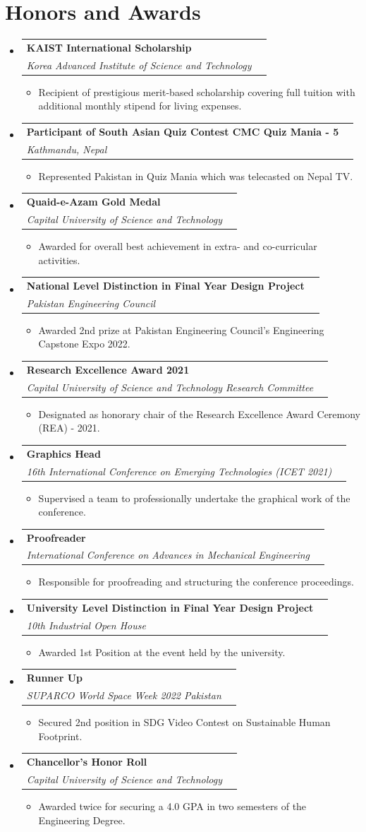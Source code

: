 \documentclass[a4paper,11pt]{article}
\makeatletter
\newcommand{\resumeProject}[4]{
\vspace{0.5mm}\item
    \begin{tabular*}{0.98\textwidth}[t]{l@{\extracolsep{\fill}}r}
        \textbf{#1} & \textit{\footnotesize{#3}} \\
        \footnotesize{\textit{#2}} & \footnotesize{#4}
    \end{tabular*}
    \vspace{-2.4mm}
}
\newcommand{\resumeSubHeadingListStart}{\begin{itemize}[leftmargin=*,labelsep=1mm]}
\newcommand{\resumeItemListStart}{\begin{itemize}[leftmargin=*,labelsep=1mm,itemsep=0.5mm]}
\newcommand{\resumeSubHeadingListEnd}{\end{itemize}\vspace{2mm}}
\newcommand{\resumeItemListEnd}{\end{itemize}\vspace{-2mm}}
\makeatother
\begin{document}
\section{\textbf{Honors and Awards}}
\vspace{-0.4mm}
\resumeSubHeadingListStart
\resumeProject
{KAIST International Scholarship}{Korea Advanced Institute of Science and Technology}
{}{}
\resumeItemListStart
\item Recipient of prestigious merit-based scholarship covering full tuition with additional monthly stipend for living expenses.
\resumeItemListEnd
\resumeProject
{Participant of South Asian Quiz Contest CMC Quiz Mania - 5}{Kathmandu, Nepal}
{}{}
\resumeItemListStart
\item Represented Pakistan in Quiz Mania which was telecasted on Nepal TV.
\resumeItemListEnd
\resumeProject
{Quaid-e-Azam Gold Medal}{Capital University of Science and Technology}
{}{}
\resumeItemListStart
\item Awarded for overall best achievement in extra- and co-curricular activities.
\resumeItemListEnd
\resumeProject
{National Level Distinction in Final Year Design Project}{Pakistan Engineering Council}
{}{}
\resumeItemListStart
\item Awarded 2nd prize at Pakistan Engineering Council's Engineering Capstone Expo 2022.
\resumeItemListEnd
\resumeProject
{Research Excellence Award 2021}{Capital University of Science and Technology Research Committee}
{}{}
\resumeItemListStart
\item Designated as honorary chair of the Research Excellence Award Ceremony (REA) - 2021.
\resumeItemListEnd
\resumeProject
{Graphics Head}{16th International Conference on Emerging Technologies (ICET 2021)}
{}{}
\resumeItemListStart
\item Supervised a team to professionally undertake the graphical work of the conference.
\resumeItemListEnd
\resumeProject
{Proofreader}{International Conference on Advances in Mechanical Engineering}
{}{}
\resumeItemListStart
\item Responsible for proofreading and structuring the conference proceedings.
\resumeItemListEnd
\resumeProject
{University Level Distinction in Final Year Design Project}{10th Industrial Open House}
{}{}
\resumeItemListStart
\item Awarded 1st Position at the event held by the university.
\resumeItemListEnd
\resumeProject
{Runner Up}{SUPARCO World Space Week 2022 Pakistan}
{}{}
\resumeItemListStart
\item Secured 2nd position in SDG Video Contest on Sustainable Human Footprint.
\resumeItemListEnd
\resumeProject
{Chancellor's Honor Roll}{Capital University of Science and Technology}
{}{}
\resumeItemListStart
\item Awarded twice for securing a 4.0 GPA in two semesters of the Engineering Degree.
\resumeItemListEnd
\resumeSubHeadingListEnd
\vspace{-6mm}
\end{document}
